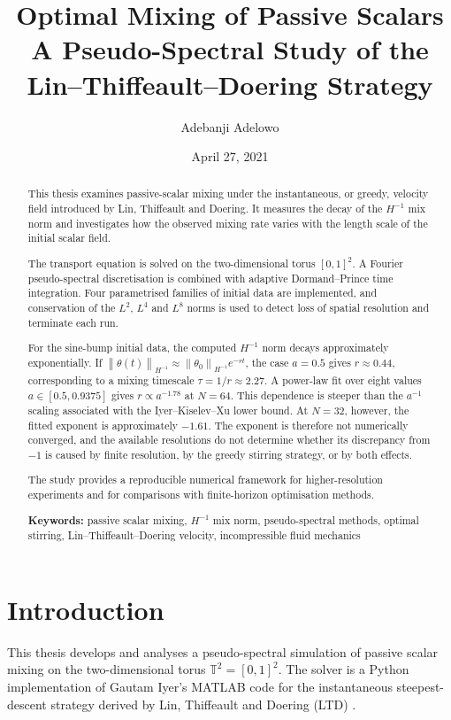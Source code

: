 \documentclass[12pt,a4paper]{article}
\title{%
  \textbf{Optimal Mixing of Passive Scalars}\\[6pt]
  \large A Pseudo-Spectral Study of the\\
  Lin--Thiffeault--Doering Strategy
}
\author{Adebanji Adelowo}
\date{April 27, 2021}
\newcommand{\norm}[1]{\left\lVert#1\right\rVert}
\theoremstyle{definition}
\theoremstyle{plain}
\begin{document}
\maketitle

\begin{abstract}
\noindent
This thesis examines passive-scalar mixing under the instantaneous, or
greedy, velocity field introduced by Lin, Thiffeault and Doering. It measures
the decay of the $H^{-1}$ mix norm and investigates how the observed mixing
rate varies with the length scale of the initial scalar field.

The transport equation is solved on the two-dimensional torus $[0,1]^2$.
A Fourier pseudo-spectral discretisation is combined with adaptive
Dormand--Prince time integration. Four parametrised families of initial
data are implemented, and conservation of the $L^2$, $L^4$ and $L^8$ norms
is used to detect loss of spatial resolution and terminate each run.

For the sine-bump initial data, the computed $H^{-1}$ norm decays
approximately exponentially. If
$\norm{\theta(t)}_{H^{-1}}\approx\norm{\theta_0}_{H^{-1}}e^{-rt}$, the case
$a=0.5$ gives $r\approx0.44$, corresponding to a mixing timescale
$\tau=1/r\approx2.27$. A power-law fit over eight values
$a\in[0.5,0.9375]$ gives $r\propto a^{-1.78}$ at $N=64$. This dependence is
steeper than the $a^{-1}$ scaling associated with the
Iyer--Kiselev--Xu lower bound. At $N=32$, however, the fitted exponent is
approximately $-1.61$. The exponent is therefore not numerically converged,
and the available resolutions do not determine whether its discrepancy
from $-1$ is caused by finite resolution, by the greedy stirring strategy,
or by both effects.

The study provides a reproducible numerical framework for higher-resolution
experiments and for comparisons with finite-horizon optimisation methods.

\medskip\noindent\textbf{Keywords:} passive scalar mixing, $H^{-1}$ mix norm,
pseudo-spectral methods, optimal stirring, Lin--Thiffeault--Doering velocity,
incompressible fluid mechanics
\end{abstract}

\tableofcontents
\bigskip

\section{Introduction}
\label{sec:intro}

This thesis develops and analyses a pseudo-spectral simulation of passive
scalar mixing on the two-dimensional torus
$\mathbb{T}^2=[0,1]^2$. The solver is a Python implementation of Gautam
Iyer's MATLAB code for the instantaneous steepest-descent strategy derived
by Lin, Thiffeault and Doering (LTD) \cite{LTD2011}.
\end{document}
